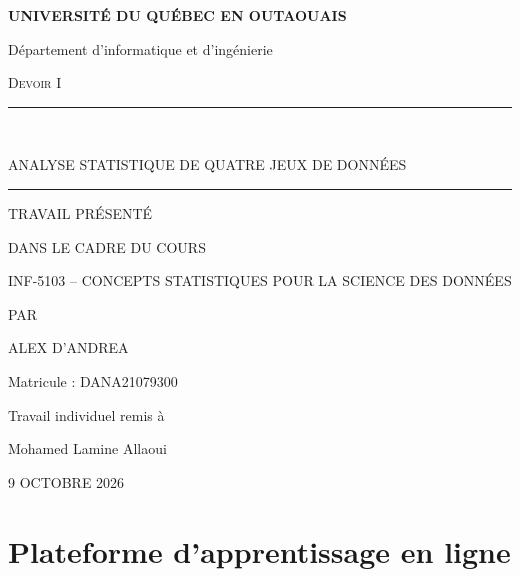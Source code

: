 \documentclass[11pt,letterpaper]{article}
\newcommand{\etudiant}{Alex D'Andrea}
\newcommand{\matricule}{DANA21079300}
\newcommand{\titredev}{Analyse statistique de quatre jeux de données}
\newcommand{\coursdev}{INF-5103 -- Concepts statistiques pour la science des données}
\newcommand{\enseignant}{Mohamed Lamine Allaoui}
\newcommand{\datedev}{9 octobre 2026}
\begin{document}
\begin{titlepage}
\thispagestyle{empty}
\centering
\vspace*{\fill}

{\MakeUppercase{\bfseries Université du Québec en Outaouais}\par}
\vspace{0.3cm}
{Département d'informatique et d'ingénierie\par}

\vspace{1.5cm}
{\large\scshape Devoir I\par}

\vspace{0.8cm}
\rule{\linewidth}{0.8pt}\\[0.5cm]
{\large\MakeUppercase{\titredev}\par}
\vspace{0.5cm}
\rule{\linewidth}{0.8pt}

\vspace{1.5cm}
TRAVAIL PRÉSENTÉ\par
DANS LE CADRE DU COURS\par
\MakeUppercase{\coursdev}

\vspace{2cm}
PAR\par
\vspace{0.4cm}
{\MakeUppercase{\etudiant}\par}
{Matricule : \matricule\par}

\vspace{1.5cm}
{Travail individuel remis à\par \enseignant\par}

\vspace{1.5cm}
\MakeUppercase{\datedev}

\vspace*{\fill}
\end{titlepage}

\section{Plateforme d'apprentissage en ligne}
\end{document}
